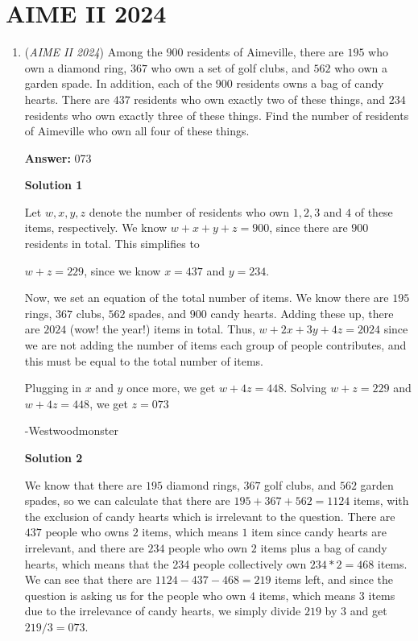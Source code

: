 \section{AIME II 2024}
        \begin{enumerate}
        	\item (\textit{AIME II 2024}) Among the $900$ residents of Aimeville, there are $195$ who own a diamond ring, $367$ who own a set of golf clubs, and $562$ who own a garden spade. In addition, each of the $900$ residents owns a bag of candy hearts. There are $437$ residents who own exactly two of these things, and $234$ residents who own exactly three of these things. Find the number of residents of Aimeville who own all four of these things.


 
 \textbf{Answer: }073



\textbf{Solution 1}

Let $w,x,y,z$ denote the number of residents who own $1,2,3$ and $4$ of these items, respectively. We know $w+x+y+z=900$, since there are $900$ residents in total. This simplifies to

 $w+z=229$, since we know $x=437$ and $y=234$.

 Now, we set an equation of the total number of items. We know there are $195$ rings, $367$ clubs, $562$ spades, and $900$ candy hearts. Adding these up, there are $2024$ (wow! the year!) items in total. Thus, $w+2x+3y+4z=2024$ since we are not adding the number of items each group of people contributes, and this must be equal to the total number of items.

 Plugging in $x$ and $y$ once more, we get $w+4z=448$. Solving $w+z=229$ and $w+4z=448$, we get $z=\boxed{073}$

 -Westwoodmonster

 



\textbf{Solution 2}

We know that there are $195$ diamond rings, $367$ golf clubs, and $562$ garden spades, so we can calculate that there are $195+367+562=1124$ items, with the exclusion of candy hearts which is irrelevant to the question. There are $437$ people who owns $2$ items, which means $1$ item since candy hearts are irrelevant, and there are $234$ people who own $2$ items plus a bag of candy hearts, which means that the 234 people collectively own $234*2=468$ items. We can see that there are $1124-437-468=219$ items left, and since the question is asking us for the people who own $4$ items, which means $3$ items due to the irrelevance of candy hearts, we simply divide $219$ by $3$ and get $219/3=\boxed{073}$.


\end{enumerate}
